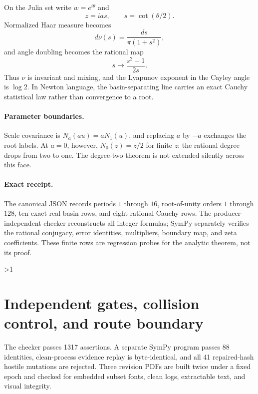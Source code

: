 \documentclass[10pt]{article}
\begin{document}
On the Julia set write \(w=e^{i\theta}\) and
\begin{equation}
 z=ia s,\qquad s=\cot(\theta/2).
\end{equation}
Normalized Haar measure becomes
\begin{equation}
 d\nu(s)=\frac{ds}{\pi(1+s^2)},
 \label{eq:cauchy}
\end{equation}
and angle doubling becomes the rational map
\begin{equation}
 s\longmapsto\frac{s^2-1}{2s}.
 \label{eq:boundary}
\end{equation}
Thus \(\nu\) is invariant and mixing, and the Lyapunov exponent in the
Cayley angle is \(\log2\).  In Newton language, the basin-separating line
carries an exact Cauchy statistical law rather than convergence to a root.

\paragraph{Parameter boundaries.}
Scale covariance is \(N_a(au)=aN_1(u)\), and replacing \(a\) by \(-a\)
exchanges the root labels.  At \(a=0\), however, \(N_0(z)=z/2\) for finite
\(z\): the rational degree drops from two to one.  The degree-two theorem is
not extended silently across this face.
\fi

\ifnum{}
\paragraph{Exact receipt.}
The canonical JSON records periods \(1\) through \(16\), root-of-unity orders
\(1\) through \(128\), ten exact real basin rows, and eight rational Cauchy
rows.  The producer-independent checker reconstructs all integer formulas;
SymPy separately verifies the rational conjugacy, error identities,
multipliers, boundary map, and zeta coefficients.  These finite rows are
regression probes for the analytic theorem, not its proof.
\fi

\ifnum\CRevisionRound>1
\section{Independent gates, collision control, and route boundary}
The checker passes 1317 assertions.  A separate SymPy program passes 88
identities, clean-process evidence replay is byte-identical, and all 41
repaired-hash hostile mutations are rejected.  Three revision PDFs are built
twice under a fixed epoch and checked for embedded subset fonts, clean logs,
extractable text, and visual integrity.
\end{document}

